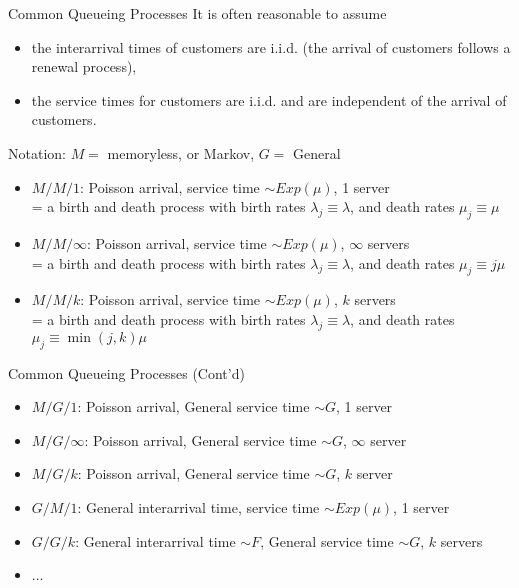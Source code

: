 \documentclass[letterpaper,handout, mathserif]{beamer}
\begin{document}
\begin{frame}{Common Queueing Processes}
It is often reasonable to assume
\begin{itemize}
\item the interarrival times of customers are i.i.d. (the arrival of customers follows a renewal process),
\item the service times for customers are i.i.d. and are independent of the arrival of customers.
\end{itemize}

Notation: $M=$ memoryless, or Markov, $G=$ General
\begin{itemize}
\item $M/M/1$: Poisson arrival, service time $\sim Exp(\mu)$, 1 server\\
= a birth and death process with birth rates $\lambda_j\equiv \lambda$, and death rates $\mu_j\equiv \mu$
\item $M/M/\infty$: Poisson arrival, service time $\sim Exp(\mu)$, $\infty$ servers\\
= a birth and death process with birth rates $\lambda_j\equiv \lambda$, and death rates $\mu_j\equiv j\mu$
\item $M/M/k$: Poisson arrival, service time $\sim Exp(\mu)$, $k$ servers\\
= a birth and death process with birth rates $\lambda_j\equiv \lambda$, and death rates $\mu_j\equiv \min(j,k)\mu$
\end{itemize}
\end{frame}
\begin{frame}{Common Queueing Processes (Cont'd)}
\begin{itemize}
\item $M/G/1$: Poisson arrival, General service time $\sim G$, 1 server
\item $M/G/\infty$: Poisson arrival, General service time $\sim G$, $\infty$ server
\item $M/G/k$: Poisson arrival, General service time $\sim G$, $k$ server
\item $G/M/1$: General interarrival time, service time $\sim Exp(\mu)$, 1 server
\item $G/G/k$: General interarrival time $\sim F$, General service time $\sim G$, $k$ servers
\item $\ldots$
\end{itemize}
\end{frame}
\end{document}
